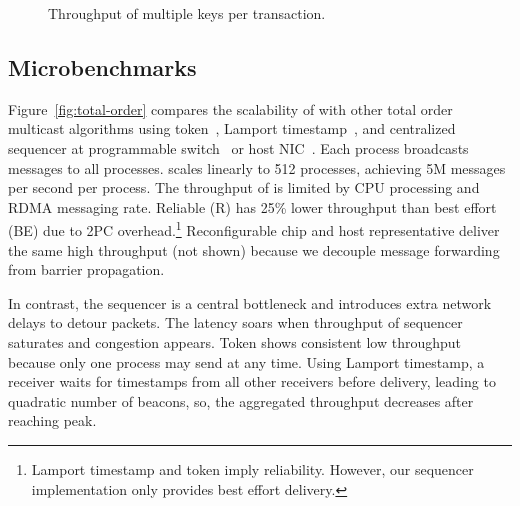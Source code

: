 \begin{figure}[t!]
\begin{minipage}{.31\textwidth}
		\centering
		\caption{Throughput of multiple keys per transaction.}
		\label{fig:multishard}
    \end{minipage}
	\hspace{0.01\textwidth}
\vspace{-15pt}
\end{figure}
\fi

\subsection{Microbenchmarks}

Figure~\ref{fig:total-order} compares the scalability of \sys{} with other total order multicast algorithms using token~\cite{rajagopalan1989token}, Lamport timestamp~\cite{lamport1978time}, and centralized sequencer at programmable switch~\cite{eris} or host NIC~\cite{kaminsky2016design}.
Each process broadcasts messages to all processes.
\sys{} scales linearly to 512 processes, achieving 5M messages per second per process.
The throughput of \sys is limited by CPU processing and RDMA messaging rate.
Reliable (R) \sys{} has 25\% lower throughput than best effort (BE) \sys{} due to 2PC overhead.\footnote{Lamport timestamp and token imply reliability. However, our sequencer implementation only provides best effort delivery.}
Reconfigurable chip and host representative deliver the same high throughput (not shown) because we decouple message forwarding from barrier propagation.


In contrast, the sequencer is a central bottleneck and introduces extra network delays to detour packets.
The latency soars when throughput of sequencer saturates and congestion appears.
Token shows consistent low throughput because only one process may send at any time.
Using Lamport timestamp, a receiver waits for timestamps from all other receivers before delivery, leading to quadratic number of beacons, so, the aggregated throughput decreases after reaching peak.





